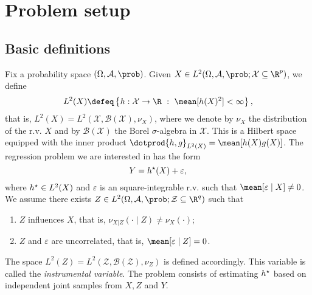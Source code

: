 \section{Problem setup}

\subsection{Basic definitions}

Fix a probability space $ ( \Omega, \mathcal{A}, \prob ) $.
Given $ X \in L^{ 2 } ( \Omega, \mathcal{A}, \prob ; \mathcal{X} \subseteq \R^{ p } ) $, we define
\begin{equation*}
    L^{ 2 } ( X ) \defeq \left\{ h : \mathcal{X} \to \R \ : \ \mean [ h ( X )^2 ] < \infty \right\}
,\end{equation*}
that is, $ L^{ 2 } ( X ) = L^{ 2 } ( \mathcal{X}, \mathcal{B} ( \mathcal{X} ), \nu_{ X } ) $, where we denote by $ \nu_{ X } $ the distribution of the r.v. $ X $ and by $ \mathcal{B} ( \mathcal{X} ) $ the Borel $ \sigma $-algebra in $ \mathcal{X} $.
This is a Hilbert space equipped with the inner product $ \dotprod{ h, g }_{ L^{ 2 } ( X ) } = \mean [ h ( X ) g ( X ) ] $.
The regression problem we are interested in has the form
\begin{equation}
    \label{eq: main problem}
    Y = h^{ \star } (X) + \varepsilon
,\end{equation}
where $ h^{ \star } \in L^{ 2 } ( X ) $ and $ \varepsilon $ is an square-integrable r.v. such that $ \mean [ \varepsilon \mid X ] \neq 0 $.
We assume there exists $ Z \in L^{ 2 } ( \Omega, \mathcal{A}, \prob ; \mathcal{Z} \subseteq \R^{ q } ) $ such that
\begin{enumerate}[label=\roman*)]
    \item $ Z $ influences $ X $, that is, $ \nu_{ X|Z } ( \cdot \mid Z ) \neq \nu_{ X } ( \cdot ) $;
    \item $ Z $ and $ \varepsilon $ are uncorrelated, that is, $ \mean [ \varepsilon \mid Z ] = 0 $.
\end{enumerate}
The space $ L^{ 2 } ( Z ) = L^{ 2 } ( \mathcal{Z}, \mathcal{B} ( \mathcal{Z} ), \nu_{ Z } ) $ is defined accordingly.
This variable is called the \emph{instrumental variable}.
The problem consists of estimating $ h^{ \star } $ based on independent joint samples from $ X, Z $ and $ Y $.


